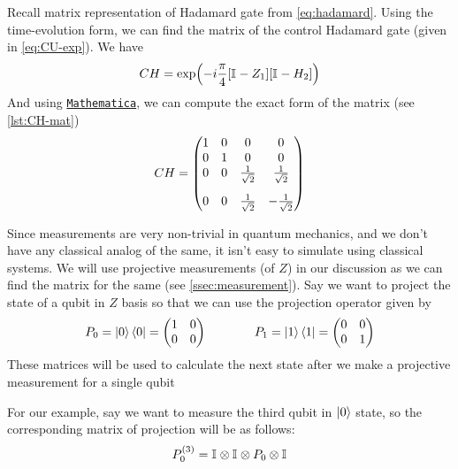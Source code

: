 \documentclass[11pt, oneside, listof=totoc]{scrbook}
\renewcommand{\u}{0}
\renewcommand{\d}{1}
\newcommand{\ku}{\ket{0}}
\newcommand{\kd}{\ket{1}}
\begin{document}
Recall matrix representation of Hadamard gate from \cref{eq:hadamard}. Using the time-evolution form, we can find the matrix of the control Hadamard gate (given in \cref{eq:CU-exp}). We have
\begin{equation*}
    CH = \exp(- i \frac{\pi}{4} [\mathbb{I}_{} - Z_1][\mathbb{I}_{} - H_2])
\end{equation*}
And using \href{https://www.wolfram.com/mathematica/}{\texttt{Mathematica}}, we can compute the exact form of the matrix (see \cref{lst:CH-mat})
\begin{equation}
    CH = \mqty(
    1 & 0 & 0 & 0 \\
    0 & 1 & 0 & 0 \\
    0 & 0 & \frac{1}{\sqrt{2}} & \frac{1}{\sqrt{2}} \\[2.5ex]
    0 & 0 & \frac{1}{\sqrt{2}} & - \frac{1}{\sqrt{2}}
    )
\end{equation}

Since measurements are very non-trivial in quantum mechanics, and we don't have any classical analog of the same, it isn't easy to simulate using classical systems. We will use projective measurements (of \(Z\)) in our discussion as we can find the matrix for the same (see \cref{ssec:measurement}). Say we want to project the state of a qubit in \(Z\) basis so that we can use the projection operator given by
\begin{equation*}
    P_{\u} = \ku \bra{\u} = \mqty(1 & 0 \\ 0 & 0) \qquad \qquad P_{\d} = \kd \bra{\d} = \mqty(0 & 0 \\ 0 & 1)
\end{equation*}
These matrices will be used to calculate the next state after we make a projective measurement for a single qubit

For our example, say we want to measure the third qubit in \(\ku\) state, so the corresponding matrix of projection will be as follows:
\begin{equation*}
    P_{\u}^{(3)} = \I{} \otimes \I{} \otimes P_{\u} \otimes \I{}
\end{equation*}

\end{document}
